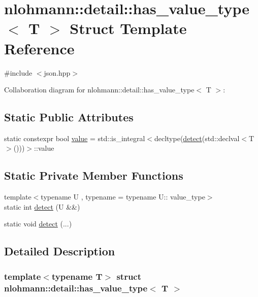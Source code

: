 \hypertarget{structnlohmann_1_1detail_1_1has__value__type}{}\section{nlohmann\+:\+:detail\+:\+:has\+\_\+value\+\_\+type$<$ T $>$ Struct Template Reference}
\label{structnlohmann_1_1detail_1_1has__value__type}


{\ttfamily \#include $<$json.\+hpp$>$}



Collaboration diagram for nlohmann\+:\+:detail\+:\+:has\+\_\+value\+\_\+type$<$ T $>$\+:
\subsection*{Static Public Attributes}
\begin{DoxyCompactItemize}
\item 
static constexpr bool \hyperlink{structnlohmann_1_1detail_1_1has__value__type_a30f340b25fe9dbb525c7675ae4df94e6}{value} = std\+::is\+\_\+integral$<$decltype(\hyperlink{structnlohmann_1_1detail_1_1has__value__type_a42b4183da4cb26f67fb15247dcc1f067}{detect}(std\+::declval$<$T$>$()))$>$\+::value
\end{DoxyCompactItemize}
\subsection*{Static Private Member Functions}
\begin{DoxyCompactItemize}
\item 
{\footnotesize template$<$typename U , typename  = typename U\+:: value\+\_\+type$>$ }\\static int \hyperlink{structnlohmann_1_1detail_1_1has__value__type_a42b4183da4cb26f67fb15247dcc1f067}{detect} (U \&\&)
\item 
static void \hyperlink{structnlohmann_1_1detail_1_1has__value__type_a786ed7348908707566a7beae86f332b2}{detect} (...)
\end{DoxyCompactItemize}


\subsection{Detailed Description}
\subsubsection*{template$<$typename T$>$\newline
struct nlohmann\+::detail\+::has\+\_\+value\+\_\+type$<$ T $>$}



